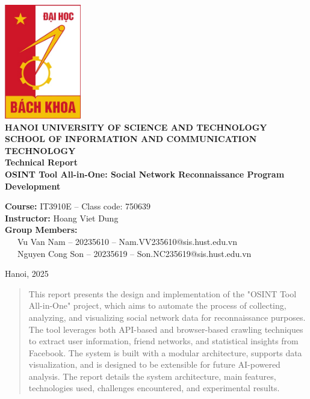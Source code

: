 \documentclass[13pt,a4paper]{report}
\begin{document}
\begin{titlepage}
    \centering
    \includegraphics[width=0.25\textwidth]{hust_logo.jpg} \\[1.5cm]
    {\Large \textbf{HANOI UNIVERSITY OF SCIENCE AND TECHNOLOGY}} \\[0.5cm]
    {\large \textbf{SCHOOL OF INFORMATION AND COMMUNICATION TECHNOLOGY}} \\[1.5cm]
    {\Huge \textbf{Technical Report}} \\[0.5cm]
    {\LARGE \textbf{OSINT Tool All-in-One: Social Network Reconnaissance Program Development}} \\[1.5cm]
    \begin{flushleft}
        \textbf{Course:} IT3910E -- Class code: 750639 \\[0.2cm]
        \textbf{Instructor:} Hoang Viet Dung \\[0.2cm]
        \textbf{Group Members:} \\ 
        \ \ \ Vu Van Nam -- 20235610 -- Nam.VV235610@sis.hust.edu.vn \\ 
        \ \ \ Nguyen Cong Son -- 20235619 -- Son.NC235619@sis.hust.edu.vn \\ 
    \end{flushleft}
    \vfill
    Hanoi, 2025
\end{titlepage}

\begin{abstract}
This report presents the design and implementation of the "OSINT Tool All-in-One" project, which aims to automate the process of collecting, analyzing, and visualizing social network data for reconnaissance purposes. The tool leverages both API-based and browser-based crawling techniques to extract user information, friend networks, and statistical insights from Facebook. The system is built with a modular architecture, supports data visualization, and is designed to be extensible for future AI-powered analysis. The report details the system architecture, main features, technologies used, challenges encountered, and experimental results.
\end{abstract}
\end{document}
